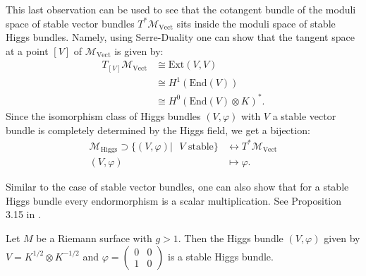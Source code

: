 This last observation can be used to see that the cotangent bundle of the moduli space of stable vector bundles $T^* \mathcal{M}_{\mathrm{Vect}}$ sits inside the moduli space of stable Higgs bundles. 
Namely, using Serre-Duality one can show that the tangent space at a point $[V]$ of $\mathcal{M}_{\mathrm{Vect}}$ is given by:
\begin{align*}
	T_{[V]}\mathcal{M}_{\mathrm{Vect}} &\cong \mathrm{Ext}(V,V)\\
	&\cong H^1(\mathrm{End}(V))\\
	&\cong H^0(\mathrm{End}(V)\otimes K)^*.
\end{align*}	
Since the isomorphism class of Higgs bundles $(V,\varphi)$ with $V$ a stable vector bundle is completely determined by the Higgs field, we get a bijection:
	\begin{align*}
	\mathcal{M}_{\mathrm{Higgs}} \supset \{ ( V,\varphi) | \mbox{ $V$ stable} \} &\longleftrightarrow T^* \mathcal{M}_{\mathrm{Vect}} \\
	( V, \varphi) &\longmapsto \varphi. 
	\end{align*}
	
\begin{remark}
	Similar to the case of stable vector bundles, one can also show that for a stable Higgs bundle every endormorphism is a scalar multiplication. See Proposition 3.15 in \cite{Hitchin}.
\end{remark}
	
\begin{example}
	Let $M$ be a Riemann surface with $g>1$. Then the Higgs bundle $(V,\varphi)$ given by $V = K^{1/2}\otimes K^ {-1/2}$ and $\varphi = \begin{pmatrix}0&0\\1&0\end{pmatrix}$ is a stable Higgs bundle. 
\end{example}
	
